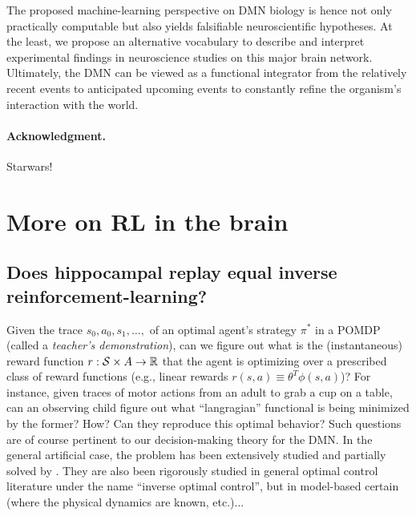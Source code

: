 \documentclass[10pt,letterpaper]{article}
\begin{document}
The proposed machine-learning perspective
on DMN biology is hence not only practically computable but
also yields falsifiable neuroscientific hypotheses.
%
At the least, we propose an alternative vocabulary to
describe and interpret experimental findings in neuroscience studies
on this major brain network.
%
Ultimately,
the DMN can be viewed as a functional integrator
from the relatively recent events to anticipated upcoming events
to constantly refine the organism's interaction with the world.



\paragraph{Acknowledgment.}
Starwars!


\small
% 
% 



\appendix

\section{More on RL in the brain}
\subsection{Does hippocampal replay equal inverse reinforcement-learning?}
  Given the trace $s_0,a_0,s_1,\ldots,$ of an optimal agent's strategy $\pi^*$ in
  a POMDP (called a \textit{teacher's demonstration}), can we figure out what is the
  (instantaneous) reward function $r: \mathcal S \times \mathcal \mathcal A
  \rightarrow \mathbb R$ that the agent is optimizing over a prescribed class of reward functions
  (e.g., linear rewards $r(s,a) \equiv \theta^T\phi(s,a)$)?
  For instance, given traces of motor actions from an adult to grab a cup on a table,
  can an observing child figure out what ``langragian'' functional is being minimized by the former?
  How? Can they reproduce this optimal behavior?
Such questions are of course pertinent to our decision-making theory for the DMN.
In the general artificial case, the problem has been extensively studied and partially solved by
\citep{abbeel2004}. They are also been rigorously studied in general optimal control literature under the name
``inverse optimal control'', but in model-based certain (where the physical dynamics are known, etc.)...
\end{document}
